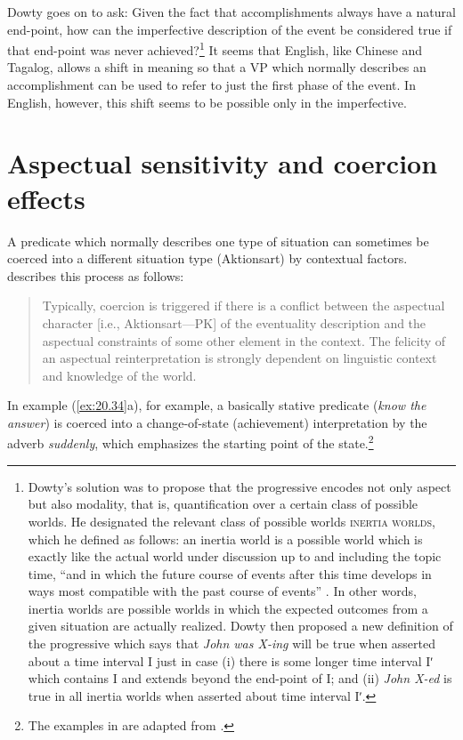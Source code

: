 Dowty goes on to ask: Given the fact that accomplishments always have a natural end-point, how can the imperfective description of the event be considered true if that end-point was never achieved?\footnote{Dowty’s solution was to propose that the progressive encodes not only aspect but also modality, that is, quantification over a certain class of possible worlds. He designated the relevant class of possible worlds \textsc{inertia worlds}, which he defined as follows: an inertia world is a possible world which is exactly like the actual world under discussion up to and including the topic time, “and in which the future course of events after this time develops in ways most compatible with the past course of events” \citep[148]{Dowty1979}. In other words, inertia worlds are possible worlds in which the expected outcomes from a given situation are actually realized. Dowty then proposed a new definition of the progressive which says that \textit{John was X-ing} will be true when asserted about a time interval I just in case (i) there is some longer time interval Iʹ which contains I and extends beyond the end-point of I; and (ii) \textit{John X-ed} is true in all inertia worlds when asserted about time interval Iʹ.} It seems that English, like Chinese and Tagalog, allows a shift in meaning so that a VP which normally describes an accomplishment can be used to refer to just the first phase of the event. In English, however, this shift seems to be possible only in the imperfective.


\section{Aspectual sensitivity and coercion effects}\label{sec:20.6}

A predicate which normally describes one type of situation can sometimes be coerced into a different situation type (Aktionsart) by contextual factors.   describes this process as follows:


\begin{quote}
Typically, coercion is triggered if there is a conflict between the aspectual character [i.e., Aktionsart—PK] of the eventuality description and the aspectual constraints of some other element in the context. The felicity of an aspectual reinterpretation is strongly dependent on linguistic context and knowledge of the world.
\end{quote}


In example (\ref{ex:20.34}a), for example, a basically stative predicate (\textit{know the answer}) is coerced into a change-of-state (achievement) interpretation by the adverb \textit{suddenly}, which emphasizes the starting point of the state.\footnote{The examples in  are adapted from \citet[359]{deSwart1998}.}


